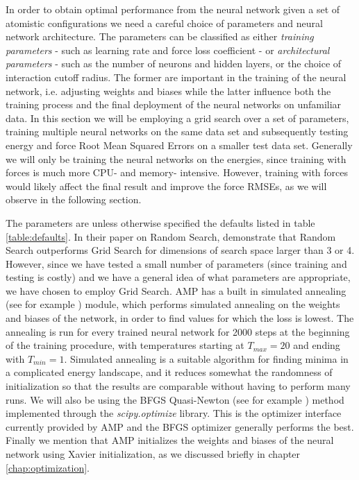 In order to obtain optimal performance from the neural network
given a set of atomistic configurations we need a careful choice of parameters
and neural network architecture. The parameters can be classified as either
\textit{training parameters} - such as learning rate and force loss coefficient -
or \textit{architectural parameters} - such as the number of neurons and hidden layers,
or the choice of interaction cutoff radius. The former are important
in the training of the neural network, i.e. adjusting weights and biases
while the latter influence both the training process and the final
deployment of the neural networks on unfamiliar data.
In this section we will be employing a grid search over a set of
parameters, training multiple neural networks on the same data set
and subsequently testing energy and force Root Mean Squared Errors on
a smaller test data set. Generally we will only be training the neural networks
on the energies, since training with forces is much more CPU- and memory-
intensive. However, training with forces would likely affect the final
result and improve the force RMSEs, as we will observe in the following section.
\par
The parameters are unless otherwise specified the defaults listed
in table \ref{table:defaults}.
In their paper on Random Search, \parencite[Bergstra and Bengio]{
    bergstra2012random}
demonstrate that Random Search outperforms Grid Search for dimensions
of search space larger than 3 or 4. However, since we have tested
a small number of parameters (since training and testing is costly)
and we have a general idea of what parameters are appropriate, we
have chosen to employ Grid Search.
AMP has a built in simulated annealing (see for example \cite{
    bertsimas1993simulated}) module, which performs
simulated annealing on the weights and biases of the network,
in order to find values for which the loss is lowest.
The annealing is run for every trained neural network
for 2000 steps at the beginning of the training procedure,
with temperatures starting at $T_{max} = 20$ and ending with $T_{min} = 1$.
Simulated annealing is a suitable algorithm for finding minima
in a complicated energy landscape, and it reduces somewhat
the randomness of initialization so that the results are comparable
without having to perform many runs.
We will also be using the BFGS Quasi-Newton (see for example \cite{
    bonnans2006numerical}) method implemented
through the \textit{scipy.optimize} library. This is
the optimizer interface currently provided by AMP
and the BFGS optimizer generally performs the best.
Finally we mention that AMP initializes the weights and biases
of the neural network using Xavier initialization\cite{glorot2010understanding},
as we discussed briefly in chapter \ref{chap:optimization}.

